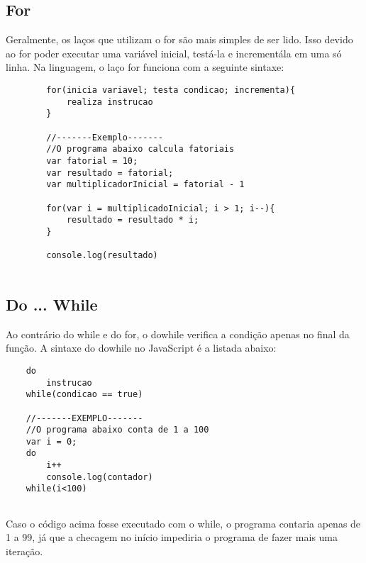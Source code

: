 	\subsection{For}
	
	Geralmente, os laços que utilizam o for são mais simples de ser lido. Isso devido ao for poder executar uma variável inicial, testá-la e incrementála em uma só linha. Na linguagem, o laço for funciona com a seguinte sintaxe:
	\begin{lstlisting}
		for(inicia variavel; testa condicao; incrementa){
			realiza instrucao
		}
	
	 	//-------Exemplo-------
	 	//O programa abaixo calcula fatoriais
	 	var fatorial = 10;
	 	var resultado = fatorial;
	 	var multiplicadorInicial = fatorial - 1
	 	
	 	for(var i = multiplicadoInicial; i > 1; i--){
	 		resultado = resultado * i;
	 	}
	 	
	 	console.log(resultado)
	 	
	\end{lstlisting}
	
	\subsection{Do ... While}
	
	Ao contrário do while e do for, o dowhile verifica a condição apenas no final da função. A sintaxe do dowhile no JavaScript é a listada abaixo:
	\begin{lstlisting}
	do
		instrucao
	while(condicao == true)
	
	//-------EXEMPLO-------
	//O programa abaixo conta de 1 a 100
	var i = 0;
	do
		i++
		console.log(contador)
	while(i<100)
	
	\end{lstlisting}
	
	Caso o código acima fosse executado com o while, o programa contaria apenas de 1 a 99, já que a checagem no início impediria o programa de fazer mais uma iteração.
	
	 
	




